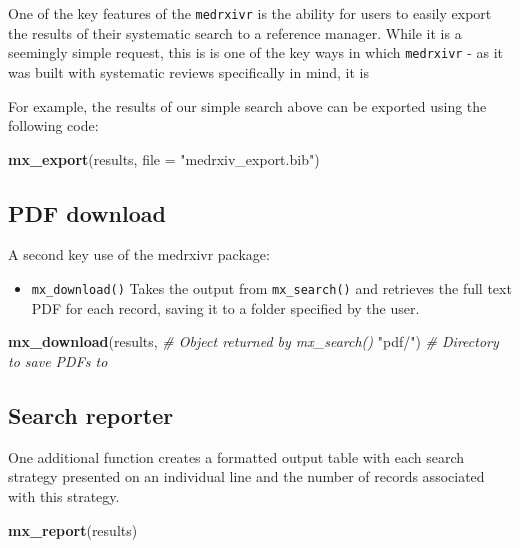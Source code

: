 \documentclass[a4paper, twoside]{templates/ociamthesis}
\providecommand{\tightlist}{%
  \setlength{\itemsep}{0pt}\setlength{\parskip}{0pt}}
\newenvironment{Shaded}{\begin{snugshade}}{\end{snugshade}}
\newcommand{\CommentTok}[1]{\textcolor[rgb]{0.56,0.35,0.01}{\textit{#1}}}
\newcommand{\DataTypeTok}[1]{\textcolor[rgb]{0.13,0.29,0.53}{#1}}
\newcommand{\KeywordTok}[1]{\textcolor[rgb]{0.13,0.29,0.53}{\textbf{#1}}}
\newcommand{\NormalTok}[1]{#1}
\newcommand{\StringTok}[1]{\textcolor[rgb]{0.31,0.60,0.02}{#1}}
\renewenvironment{Shaded}
{
  \vspace{4pt}%
  \begin{snugshade}%
}{%
  \end{snugshade}%
  \vspace{4pt}%
}
\begin{document}
One of the key features of the \texttt{medrxivr} is the ability for users to easily export the results of their systematic search to a reference manager. While it is a seemingly simple request, this is is one of the key ways in which \texttt{medrxivr} - as it was built with systematic reviews specifically in mind, it is

For example, the results of our simple search above can be exported using the following code:

\begin{Shaded}
\begin{Highlighting}[]
\KeywordTok{mx_export}\NormalTok{(results, }
          \DataTypeTok{file =} \StringTok{"medrxiv_export.bib"}\NormalTok{)}
\end{Highlighting}
\end{Shaded}

\hypertarget{pdf-download}{%
\subsection{PDF download}\label{pdf-download}}

A second key use of the medrxivr package:

\begin{itemize}
\tightlist
\item
  \texttt{mx\_download()} Takes the output from \texttt{mx\_search()} and retrieves the full text PDF for each record, saving it to a folder specified by the user.
\end{itemize}

\begin{Shaded}
\begin{Highlighting}[]
\KeywordTok{mx_download}\NormalTok{(results,        }\CommentTok{# Object returned by mx_search()}
            \StringTok{"pdf/"}\NormalTok{)         }\CommentTok{# Directory to save PDFs to }
\end{Highlighting}
\end{Shaded}

\hypertarget{search-reporter}{%
\subsection{Search reporter}\label{search-reporter}}

One additional function creates a formatted output table with each search strategy presented on an individual line and the number of records associated with this strategy.

\begin{Shaded}
\begin{Highlighting}[]
\KeywordTok{mx_report}\NormalTok{(results)}
\end{Highlighting}
\end{Shaded}
\end{document}
